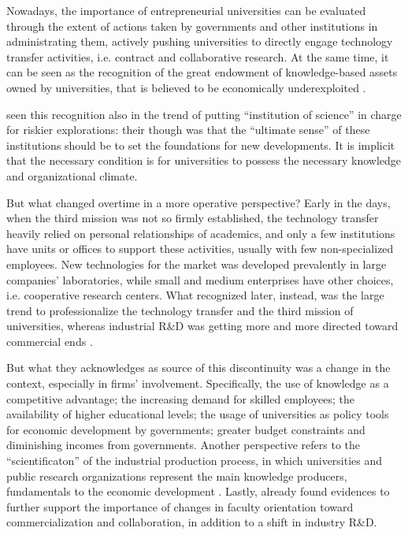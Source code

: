 Nowadays, the importance of entrepreneurial universities can be evaluated through the extent of actions taken by governments and other institutions in administrating them, actively pushing universities to directly engage technology transfer activities, i.e. contract and collaborative research. At the same time, it can be seen as the recognition of the great endowment of knowledge-based assets owned by universities, that is believed to be economically underexploited \citep{Tijssen2006}. 

\citet{Balconi2006} seen this recognition also in the trend of putting \enquote{institution of science} in charge for riskier explorations: their though was that the \enquote{ultimate sense} of these institutions should be to set the foundations for new developments. It is implicit that the necessary condition is for universities to possess the necessary knowledge and organizational climate.

But what changed overtime in a more operative perspective? Early in the days, when the third mission was not so firmly established, the technology transfer heavily relied on personal relationships of academics, and only a few institutions have units or offices to support these activities, usually with few non-specialized employees. New technologies for the market was developed prevalently in large companies' laboratories, while small and medium enterprises have other choices, i.e. cooperative research centers. What \citet{Geuna2009} recognized later, instead, was the large trend to professionalize the technology transfer and the third mission of universities, whereas industrial R\&D was getting more and more directed toward commercial ends \citep{Fritsch2007}.

But what they acknowledges as source of this discontinuity was a change in the context, especially in firms' involvement. Specifically, the use of knowledge as a competitive advantage; the increasing demand for skilled employees; the availability of higher educational levels; the usage of universities as policy tools for economic development by governments; greater budget constraints and diminishing incomes from governments. Another perspective refers to the \enquote{scientificaton} of the industrial production process, in which universities and public research organizations represent the main knowledge producers, fundamentals to the economic development \citep{Balderi2007}. Lastly, already \citet{Thursby2002} found evidences to further support the importance of changes in faculty orientation toward commercialization and collaboration, in addition to a shift in industry R\&D.

